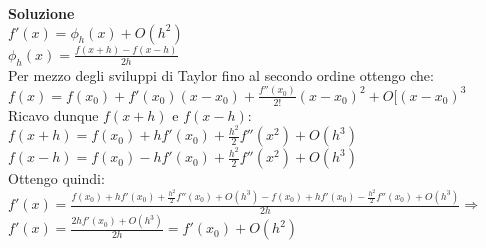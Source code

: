 \large\noindent{}
\begin{flushleft}
	\large \textbf{Soluzione}\\[0.5cm]
	$f'(x) = \phi_{h}(x) + O(h^{2})$\\[0.3cm]
	$\phi_{h}(x) = \frac {f(x+h)-f(x-h)}{2h}$\\[0.3cm]
	Per mezzo degli sviluppi di Taylor fino al secondo ordine ottengo che:\\[0.3cm]
	$f(x) = f(x_{0})+ f'(x_{0})(x-x_{0})+\frac {f''(x_{0})}{2!}(x-x_{0})^{2}+O[(x-x_{0})^{3}$\\[0.3cm]
	Ricavo dunque $f(x+h)$ e $f(x-h)$:\\[0.3cm]
	$f(x+h) = f(x_{0})+ hf'(x_{0})+\frac{h^{2}}{2}f''(x^{2})+O(h^{3})$\\[0.3cm]
	$f(x-h) = f(x_{0})- hf'(x_{0})+\frac{h^{2}}{2}f''(x^{2})+O(h^{3})$\\[0.3cm]
	Ottengo quindi:
	$f'(x) = \frac{f(x_{0})+hf'(x_{0})+\frac{h^{2}}{2}f''(x_{0})+O(h^{3})-f(x_{0})+hf'(x_{0})-\frac{h^{2}}{2}f''(x_{0})+O(h^{3})}{2h}\Longrightarrow$\\[0.3cm]
	$f'(x) = \frac{2hf'(x_{0})+O(h^{3})}{2h} = f'(x_{0})+O(h^{2})$
\end{flushleft}